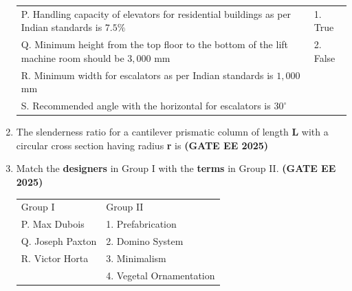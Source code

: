 \documentclass[journal,12pt,onecolumn]{IEEEtran}
\theoremstyle{remark}
\begin{document}
\begin{enumerate}
\begin{tabular}{p{}p{}}
P. Handling capacity of elevators for residential buildings as per Indian standards is $7.5\%$      &  1. True\\
Q. Minimum height from the top floor to the bottom of the lift machine room should be $3,000$ mm     & 2. False\\
R. Minimum width for escalators as per Indian standards is $1,000$ mm & \\
S. Recommended angle with the horizontal for escalators is $30^\circ$  &  \\
\end{tabular}
\begin{enumerate}
\end{enumerate}
\item The slenderness ratio for a cantilever prismatic column of length \textbf{L} with a circular cross section having radius \textbf{r} is \hfill \textbf{(GATE EE 2025)} 
\begin{enumerate}
\end{enumerate}
\item Match the \textbf{designers} in Group I with the \textbf{terms} in Group II. \hfill \textbf{(GATE EE 2025)}
\newline
\begin{tabular}{p{}p{}}
Group I     & Group II \\
P. Max Dubois     & 1. Prefabrication\\
Q. Joseph Paxton & 2. Domino System\\
R. Victor Horta & 3. Minimalism\\
   & 4. Vegetal Ornamentation\\
   \end{tabular}
\begin{enumerate}
\end{enumerate}
  

\end{enumerate}
\end{document}
